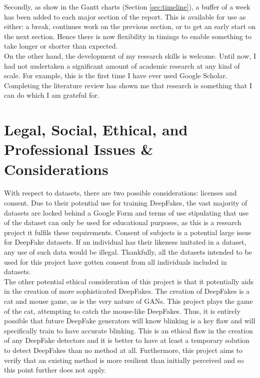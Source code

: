 \documentclass{article}
\begin{document}
Secondly, as show in the Gantt charts (Section \ref{sec:timeline}), a buffer of a week has been added to each major section of the report. This is available for use as either: a break, continues work on the previous section, or to get an early start on the next section. Hence there is now flexibility in timings to enable something to take longer or shorter than expected.\\


On the other hand, the development of my research skills is welcome. Until now, I had not undertaken a significant amount of academic research at any kind of scale. For example, this is the first time I have ever used Google Scholar. Completing the literature review has shown me that research is something that I can do which I am grateful for.

\section{Legal, Social, Ethical, and Professional Issues \& Considerations}

With respect to datasets, there are two possible considerations: licenses and consent. Due to their potential use for training DeepFakes, the vast majority of datasets are locked behind a Google Form and terms of use stipulating that use of the dataset can only be used for educational purposes, as this is a research project it fulfils these requirements. Consent of subjects is a potential large issue for DeepFake datasets. If an individual has their likeness imitated in a dataset, any use of such data would be illegal. Thankfully, all the datasets intended to be used for this project have gotten consent from all individuals included in datasets.\\

The other potential ethical consideration of this project is that it potentially aids in the creation of more sophisticated DeepFakes. The creation of DeepFakes is a cat and mouse game, as is the very nature of GANs. This project plays the game of the cat, attempting to catch the mouse-like DeepFakes. Thus, it is entirely possible that future DeepFake generators will know blinking is a key flaw and will specifically train to have accurate blinking. This is an ethical flaw in the creation of any DeepFake detectors and it is better to have at least a temporary solution to detect DeepFakes than no method at all. Furthermore, this project aims to verify that an existing method is more resilient than initially perceived and so this point further does not apply.
\end{document}
